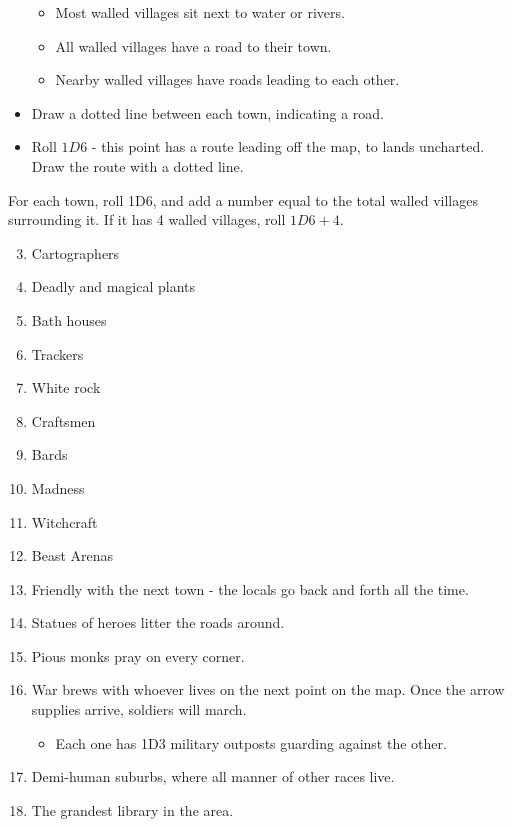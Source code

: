 \begin{multicols}{2}
\begin{itemize}
  \begin{itemize}
  \item
    Most walled villages sit next to water or rivers.
  \item
    All walled villages have a road to their town.
  \item
    Nearby walled villages have roads leading to each other.
  \end{itemize}
\item
  Draw a dotted line between each town, indicating a road.
\item
  Roll $1D6$ - this point has a route leading off the map, to lands
  uncharted. Draw the route with a dotted line.
\end{itemize}


For each town, roll 1D6, and add a number equal to the total walled villages surrounding it.
If it has 4 walled villages, roll $1D6+4$.

\begin{multicols}{2}

\begin{enumerate}
\setcounter{enumi}{2}
\item
  Cartographers
\item
  Deadly and magical plants
\item
  Bath houses
\item
  Trackers
\item
  White rock
\item
  Craftsmen
\item
  Bards
\item
  Madness
\item
  Witchcraft
\item
  Beast Arenas
\item
  Friendly with the next town - the locals go back and forth all the
  time.
\item
  Statues of heroes litter the roads around.
\item
  Pious monks pray on every corner.
\item
  War brews with whoever lives on the next point on the map. Once the
  arrow supplies arrive, soldiers will march.

  \begin{itemize}
  \item
    Each one has 1D3 military outposts guarding against the other.
  \end{itemize}
\item
  Demi-human suburbs, where all manner of other races live.
\item
  The grandest library in the area.
\end{enumerate}


\end{multicols}
\end{multicols}
